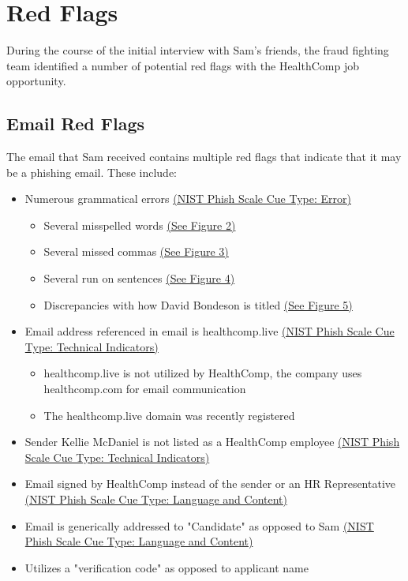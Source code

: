 \section{Red Flags} %
\begin{fullwidth}
During the course of the initial interview with Sam's friends, the fraud fighting team identified a number of potential red flags with the HealthComp job opportunity.

\subsection{Email Red Flags}
The email that Sam received contains multiple red flags that indicate that it may be a phishing email. These include:
\begin{itemize}
	\item Numerous grammatical errors \hyperref[sec:NIST Phish Scale]{(NIST Phish Scale Cue Type: Error)}
        \begin{itemize}
            \item Several misspelled words \hyperref[sec:Fig2]{(See Figure 2)}
            \item Several missed commas \hyperref[sec:Fig3]{(See Figure 3)}
            \item Several run on sentences \hyperref[sec:Fig4]{(See Figure 4)}
            \item Discrepancies with how David Bondeson is titled
            \hyperref[sec:Fig5]{(See Figure 5)}
        \end{itemize}
    \item Email address referenced in email is healthcomp.live \hyperref[sec:NIST Phish Scale]{(NIST Phish Scale Cue Type: Technical Indicators)}
        \begin{itemize}
            \item healthcomp.live is not utilized by HealthComp, the company uses healthcomp.com for email communication
            \item The healthcomp.live domain was recently registered
        \end{itemize}
    \item Sender Kellie McDaniel is not listed as a HealthComp employee \hyperref[sec:NIST Phish Scale]{(NIST Phish Scale Cue Type: Technical Indicators)}
	\item Email signed by HealthComp instead of the sender or an HR Representative \hyperref[sec:NIST Phish Scale]{(NIST Phish Scale Cue Type: Language and Content)}
	\item Email is generically addressed to "Candidate" as opposed to Sam \hyperref[sec:NIST Phish Scale]{(NIST Phish Scale Cue Type: Language and Content)}
    \item Utilizes a "verification code" as opposed to applicant name
\end{itemize}


\end{fullwidth}
